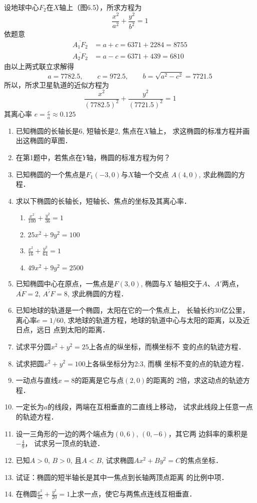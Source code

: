 \begin{solution}
    设地球中心$F_2$在$X$轴上（图6.5），所求方程为
\[\frac{x^2}{a^2}+\frac{y^2}{b^2}=1\]
依题意
\[\begin{split}
    \overline{A_1F_2}&=a+c=6371+2284=8755\\
    \overline{A_2F_2}&=a-c=6371+439=6810
\end{split}\]
由以上两式联立求解得
\[a=7782.5,\qquad c=972.5,\qquad b=\sqrt{a^2-c^2}=7721.5\]
所以，所求卫星轨道的近似方程为
\[\frac{x^2}{(7782.5)^2}+\frac{y^2}{(7721.5)^2}=1\]
其离心率
$e=\frac{c}{a}\approx 0.125$
\end{solution}

\begin{ex}
\begin{enumerate}
    \item 已知椭圆的长轴长是6, 短轴长是2, 焦点在$X$轴上，
    求这椭圆的标准方程并画出这椭圆的草图．
    \item 在第1题中，若焦点在$Y$轴，椭圆的标准方程为何？
    \item 已知椭圆的一个焦点是$F_1(-3,0)$与$X$轴一个交点
    $A(4,0)$, 求此椭圆的方程．
    \item 求以下椭圆的长轴长，短轴长、焦点的坐标及其离心率．
\begin{multicols}{2}
\begin{enumerate}
    \item $\frac{x^2}{100}+\frac{y^2}{36}=1$
    \item $25x^2+9y^2=100$
    \item $\frac{x^2}{16}+\frac{y^2}{64}=1$
    \item $49x^2+9y^2=2500$
\end{enumerate}
\end{multicols}

\item 已知椭圆中心在原点，一焦点是$F(3,0)$, 椭圆与$X$
轴相交于$A$、$A'$两点，$\overline{AF}=2$, $\overline{A'F}=8$, 求此椭圆的方程．
\item 已知地球的轨道是一个椭圆，太阳在它的一个焦点上，
长轴长约30亿公里，离心率$e=1/60$, 
求地球的轨道方程，地球的轨道中心与太阳的距离，以及近日点，远日
点到太阳的距离．
\item 试求平分圆$x^2+y^2=25$上各点的纵坐标，而横坐标不
变的点的轨迹方程．
\item 试求把圆$x^2+y^2=100$上各纵坐标分为2:3, 而横
坐标不变的点的轨迹方程．
\item 一动点与直线$x=8$的距离是它与点$(2,0)$的距离的
2倍，求这动点的轨迹方程．
\item 一定长为$a$的线段，两端在互相垂直的二直线上移动，
试求此线段上任意一点的轨迹方程．
\item 设一三角形的一边的两个端点为$(0,6)$, $(0,-6)$，其它两
边斜率的乘积是$-\frac{4}{9}$，
试求另一顶点的轨迹．
\item 已知$A>0$, $B>0$, 且$A<B$, 试求椭圆$Ax^2+By^2
=C$的焦点坐标．
\item 试证：椭圆的短半轴长是其中一焦点到长轴两顶点距离
的比例中项．
\item 在椭圆$\frac{x^2}{45}+\frac{y^2}{20}=1$上求一点，使它与两焦点连线互相垂直．
\end{enumerate}
\end{ex}


